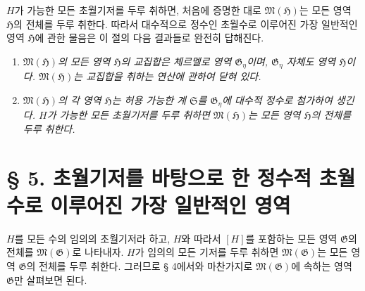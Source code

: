 $H$가 가능한 모든 초월기저를 두루 취하면, 처음에 증명한 대로 $\mathfrak M(\mathfrak H)$는 모든 영역 $\mathfrak H$의 전체를 두루 취한다. 따라서 대수적으로 정수인 초월수로 이루어진 가장 일반적인 영역 $\mathfrak H$에 관한 물음은 이 절의 다음 결과들로 완전히 답해진다.

\begin{enumerate}
\item[a)] \emph{$\mathfrak M(\mathfrak H)$의 모든 영역 $\mathfrak H$의 교집합은 체르멜로 영역 $\mathfrak G_\eta$이며, $\mathfrak G_\eta$ 자체도 영역 $\mathfrak H$이다. $\mathfrak M(\mathfrak H)$는 교집합을 취하는 연산에 관하여 닫혀 있다.}
\item[b)] \emph{$\mathfrak M(\mathfrak H)$의 각 영역 $\mathfrak H$는 허용 가능한 계 $\mathfrak S$를 $\mathfrak G_\eta$에 대수적 정수로 첨가하여 생긴다. $H$가 가능한 모든 초월기저를 두루 취하면 $\mathfrak M(\mathfrak H)$는 모든 영역 $\mathfrak H$의 전체를 두루 취한다.}
\end{enumerate}

\section*{§ 5. 초월기저를 바탕으로 한 정수적 초월수로 이루어진 가장 일반적인 영역}

$H$를 모든 수의 임의의 초월기저라 하고, $H$와 따라서 $[H]$를 포함하는 모든 영역 $\mathfrak G$의 전체를 $\mathfrak M(\mathfrak G)$로 나타내자. $H$가 임의의 모든 기저를 두루 취하면 $\mathfrak M(\mathfrak G)$는 모든 영역 $\mathfrak G$의 전체를 두루 취한다. 그러므로 § 4에서와 마찬가지로 $\mathfrak M(\mathfrak G)$에 속하는 영역 $\mathfrak G$만 살펴보면 된다.

